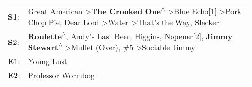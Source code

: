 \begin{supertabular}{p{0.03\textwidth}p{0.92\textwidth}}
 \textbf{S1}:  &  Great American\textsuperscript{} \textgreater \enspace \textbf{The Crooked One\textsuperscript{$\wedge$}} \textgreater \enspace Blue Echo[1]\textsuperscript{} \textgreater \enspace Pork Chop Pie\textsuperscript{}, \enspace Dear Lord\textsuperscript{} \textgreater \enspace Water\textsuperscript{} \textgreater \enspace That's the Way\textsuperscript{}, \enspace Slacker\textsuperscript{}  \enspace  \\
 \textbf{S2}:  &                          \textbf{Roulette\textsuperscript{$\wedge$}}, \enspace Andy's Last Beer\textsuperscript{}, \enspace Higgins\textsuperscript{}, \enspace Nopener[2]\textsuperscript{}, \enspace \textbf{Jimmy Stewart\textsuperscript{$\wedge$}} \textgreater \enspace Mullet (Over)\textsuperscript{}, \enspace \#5\textsuperscript{} \textgreater \enspace Sociable Jimmy\textsuperscript{}  \enspace  \\
 \textbf{E1}:  &                                                                                                                                                                                                                                                                                                                                                                         Young Lust\textsuperscript{}  \enspace  \\
 \textbf{E2}:  &                                                                                                                                                                                                                                                                                                                                                                  Professor Wormbog\textsuperscript{}  \enspace  \\
\end{supertabular}
